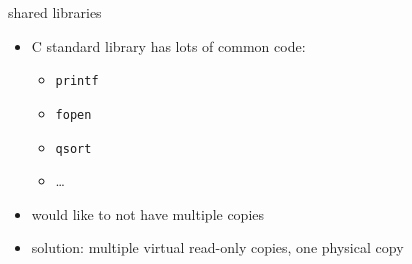 \begin{frame}{shared libraries}
\begin{itemize}
\item C standard library has lots of common code:
\begin{itemize}
\item {\tt printf}
\item {\tt fopen}
\item {\tt qsort}
\item \ldots
\end{itemize}
\item would like to not have multiple copies
\vspace{.5cm}
\item solution: multiple virtual read-only copies, one physical copy
\end{itemize}
\end{frame}

